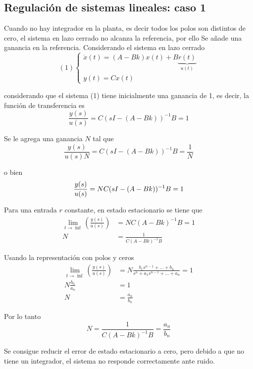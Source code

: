 \subsection{Regulación de sistemas lineales: caso 1}

Cuando no hay integrador en la planta, es decir todos los polos son distintos de cero, el sistema en lazo cerrado no alcanza la referencia, por ello Se añade una ganancia en la referencia.
Considerando el sistema en lazo cerrado
\[
    (1)
    \left\{
        \begin{array}{lll}
            \dot{x}(t) = (A-Bk)x(t) + B\underbrace{r(t)}_{u(t)}\\
            y(t) = Cx(t)
        \end{array}
    \right.
\]

considerando que el sistema (1) tiene inicialmente una ganancia de 1, es decir, la función de transferencia es
\[
    \frac{y(s)}{u(s)} = C(sI-(A-Bk))^{-1}B = 1
\]

Se le agrega una ganancia \( N \) tal que
\[
    \frac{y(s)}{u(s)N} = C(sI-(A-Bk))^{-1}B = \frac{1}{N}
\]

o bien
\[
    \frac{y(s)}{u(s)} = NC(sI-(A-Bk))^{-1}B = 1 \\
\]

Para una entrada \( r \) constante, en estado estacionario se tiene que 
\[
    \begin{split}
        \lim_{t \to \inf}(\frac{y(s)}{u(s)}) & = NC(A-Bk)^{-1}B = 1\\
        N & = \frac{1}{C(A-Bk)^{-1}B}
    \end{split}
\]

Usando la representación con polos y ceros
\[
    \begin{split}
        \lim_{t \to \inf}(\frac{y(s)}{u(s)}) & = N \frac{ b_{1}s^{n-1} + \ldots + b_{n} }{ s^{n} + a_{1}s^{n-1} +\ldots + a_{n} } = 1 \\
        N \frac{b_{n}}{a_{n}} & = 1 \\
        N & = \frac{a_{n}}{b_{n}}
    \end{split}
\]

Por lo tanto
\[
    N = \frac{1}{C(A-Bk)^{-1}B} = \frac{a_{n}}{b_{n}}
\]

Se consigue reducir el error de estado estacionario a cero, pero debido a que no tiene un integrador, el sistema no responde correctamente ante ruido.